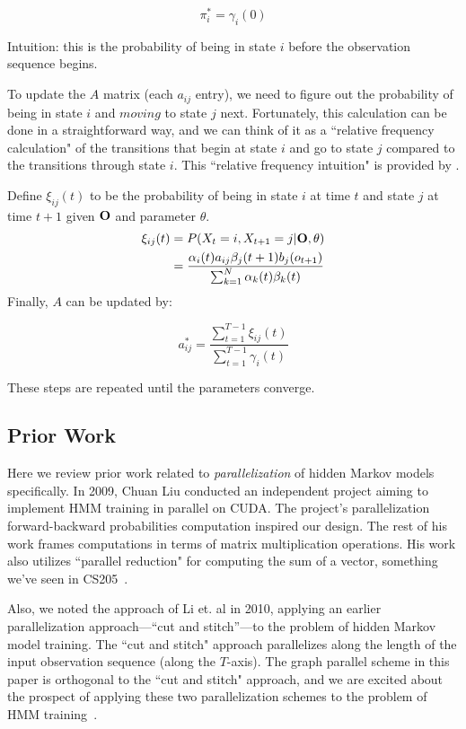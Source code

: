 \begin{equation}\label{pi}
\pi_i^* = \gamma_i(0)
\end{equation}

Intuition: this is the probability of being in state $i$ before the observation sequence begins.  

To update the $A$ matrix (each $a_{ij}$ entry), we need to figure  out the probability of being in state $i$ and $\textit{moving}$ to state $j$ next.  Fortunately, this calculation can be done in a straightforward way, and we can think of it as a ``relative frequency calculation" of the transitions that begin at state $i$ and go to state $j$ compared to the transitions through state $i$.  This ``relative frequency intuition" is provided by \cite{rabiner1986introduction}.

Define $\xi_{ij}(t)$ to be the probability of being in state $i$ at time $t$ and state $j$ at time $t+1$ given $\bold{O}$ and parameter $\theta$. 
\begin{equation}\label{xi}
\begin{aligned}
\xi_{ij}(t) &= P(X_t = i, X_{t+1} = j | \bold{O}, \theta)  \\
&=\frac{\alpha_i(t) a_{ij} \beta_j(t+1)b_{j}(o_{t+1})}{\sum_{k=1}^N \alpha_k(t) \beta_k(t)}
\end{aligned}
\end{equation}
Finally, $A$ can be updated by: 

\begin{equation}\label{a}
a^*_{ij} = \frac{\sum_{t=1}^{T-1}\xi_{ij}(t)}{\sum_{t=1}^{T-1}\gamma_i(t)}
\end{equation}

These steps are repeated until the parameters converge. 

\subsection{Prior Work}

Here we review prior work related to \textit{parallelization} of hidden Markov
models specifically.  In 2009, Chuan Liu conducted an independent project aiming
to implement HMM training in parallel on CUDA.  The project's parallelization
forward-backward probabilities computation inspired our design.  The rest of his
work frames computations in terms of matrix multiplication operations.  His work
also utilizes ``parallel reduction" for computing the sum of a vector, something
we've seen in CS205~\cite{cuda-hmm}.

Also, we noted the approach of Li et. al in 2010, applying an earlier
parallelization approach---``cut and stitch''---to the problem of hidden Markov
model training.  The ``cut and stitch" approach parallelizes along the length of
the input observation sequence (along the $T$-axis).  The graph parallel scheme
in this paper is orthogonal to the ``cut and stitch" approach, and we are
excited about the prospect of applying these two parallelization schemes to the
problem of HMM training~\cite{cut-stitch}.
